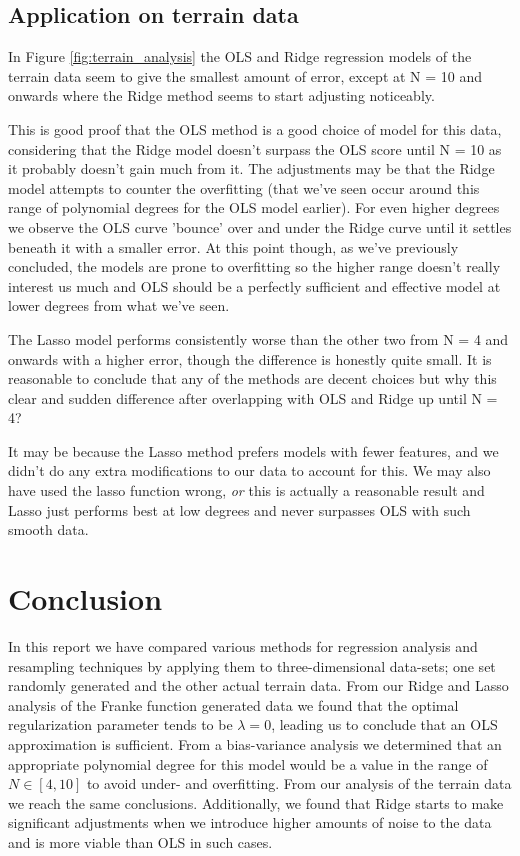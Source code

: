 \documentclass[reprint,english,notitlepage]{revtex4-1}  %
\begin{document}
\subsection{Application on terrain data}

In Figure \ref{fig:terrain_analysis} the OLS and Ridge regression models of the terrain data seem to give the smallest amount of error, except at N = 10 and onwards where the Ridge method seems to start adjusting noticeably.

This is good proof that the OLS method is a good choice of model for this data, considering that the Ridge model doesn't surpass the OLS score until N = 10 as it probably doesn't gain much from it. The adjustments may be that the Ridge model attempts to counter the overfitting (that we've seen occur around this range of polynomial degrees for the OLS model earlier). For even higher degrees we observe the OLS curve 'bounce' over and under the Ridge curve until it settles beneath it with a smaller error. At this point though, as we've previously concluded, the models are prone to overfitting so the higher range doesn't really interest us much and OLS should be a perfectly sufficient and effective model at lower degrees from what we've seen.

The Lasso model performs consistently worse than the other two from N = 4 and onwards with a higher error, though the difference is honestly quite small. It is reasonable to conclude that any of the methods are decent choices but why this clear and sudden difference after overlapping with OLS and Ridge up until N = 4? 

It may be because the Lasso method prefers models with fewer features, and we didn't do any extra modifications to our data to account for this. We may also have used the lasso function wrong, \textit{or} this is actually a reasonable result and Lasso just performs best at low degrees and never surpasses OLS with such smooth data.

\section{Conclusion}

In this report we have compared various methods for regression analysis and resampling techniques by applying them to three-dimensional data-sets; one set randomly generated and the other actual terrain data. From our Ridge and Lasso analysis of the Franke function generated data we found that the optimal regularization parameter tends to be $\lambda = 0$, leading us to conclude that an OLS approximation is sufficient. From a bias-variance analysis we determined that an appropriate polynomial degree for this model would be a value in the range of $N \in [4, 10]$ to avoid under- and overfitting. From our analysis of the terrain data we reach the same conclusions. Additionally, we found that Ridge starts to make significant adjustments when we introduce higher amounts of noise to the data and is more viable than OLS in such cases.
\end{document}
